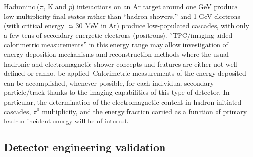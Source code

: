 

 Hadroninc ($\pi$, K and $p$) interactions on an Ar target around one GeV produce low-multiplicity final states rather than ``hadron showers,'' 
 and 1-GeV electrons  (with critical energy $\simeq 30$ MeV in Ar) produce low-populated cascades, with only a few tens of secondary energetic electrons (positrons). 
``TPC/imaging-aided calorimetric measurements'' in this energy range may allow investigation of 
energy deposition mechanisms and reconstruction methods where the usual hadronic and electromagnetic shower concepts and features are either not well defined or cannot be applied.
Calorimetric measurements of the energy deposited can be accomplished,  whenever possible, for each individual secondary particle/track thanks to the imaging capabilities of this type of detector.
In particular, the determination of the electromagnetic  content in hadron-initiated cascades, $\pi^0$ multiplicity, and the energy fraction carried as a function of primary hadron incident energy will be of interest.



\subsection{Detector engineering validation}  %

